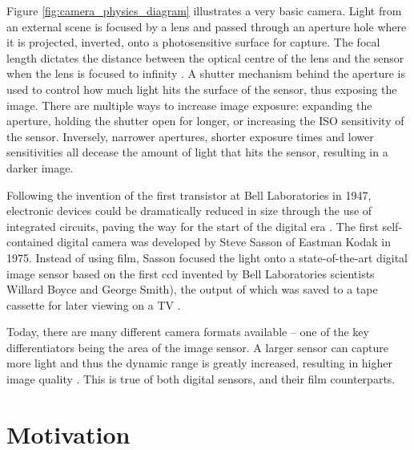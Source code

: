 Figure \ref{fig:camera_physics_diagram} illustrates a very basic camera. Light from an external scene is focused by a lens and passed through an aperture hole where it is projected, inverted, onto a photosensitive surface for capture. The focal length dictates the distance between the optical centre of the lens and the sensor when the lens is focused to infinity \cite{4_pot_2010}. A shutter mechanism behind the aperture is used to control how much light hits the surface of the sensor, thus exposing the image. There are multiple ways to increase image exposure: expanding the aperture, holding the shutter open for longer, or increasing the ISO sensitivity of the sensor. Inversely, narrower apertures, shorter exposure times and lower sensitivities all decease the amount of light that hits the sensor, resulting in a darker image. 

Following the invention of the first transistor at Bell Laboratories in 1947, electronic devices could be dramatically reduced in size through the use of integrated circuits, paving the way for the start of the digital era \cite{5_computer_history_museum}. The first self-contained digital camera was developed by Steve Sasson of Eastman Kodak in 1975. Instead of using film, Sasson focused the light onto a state-of-the-art digital image sensor based on the first \gls{ccd} invented by Bell Laboratories scientists Willard Boyce and George Smith), the output of which was saved to a tape cassette for later viewing on a TV \cite{6_information_for_the_public,7_sasson_2007}.

Today, there are many different camera formats available -- one of the key differentiators being the area of the image sensor. A larger sensor can capture more light and thus the dynamic range is greatly increased, resulting in higher image quality \cite{8_chen_catrysse_el_gamal_wandell_2000}. This is true of both digital sensors, and their film counterparts.

\section{Motivation}


